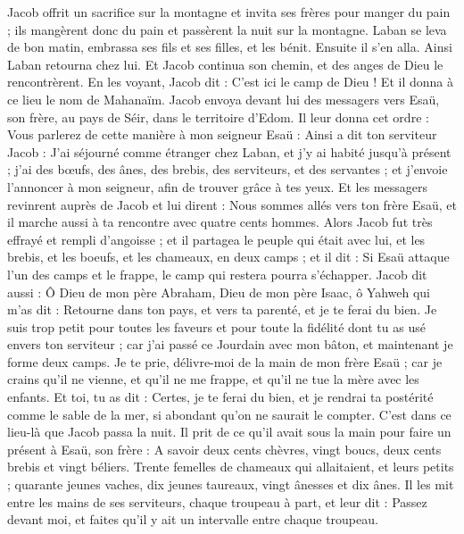 \begin{multicols}{2}
Jacob offrit un sacrifice sur la montagne et invita ses frères pour manger du pain ; ils mangèrent donc du pain et passèrent la nuit sur la montagne.
Laban se leva de bon matin, embrassa ses fils et ses filles, et les bénit. Ensuite il s'en alla. Ainsi Laban retourna chez lui.
\VerseOne{}Et Jacob continua son chemin, et des anges de Dieu le rencontrèrent.
En les voyant, Jacob dit : C'est ici le camp de Dieu ! Et il donna à ce lieu le nom de Mahanaïm.
Jacob envoya devant lui des messagers vers Esaü, son frère, au pays de Séir, dans le territoire d'Edom.
Il leur donna cet ordre : Vous parlerez de cette manière à mon seigneur Esaü : Ainsi a dit ton serviteur Jacob : J'ai séjourné comme étranger chez Laban, et j'y ai habité jusqu'à présent ;
j'ai des bœufs, des ânes, des brebis, des serviteurs, et des servantes ; et j'envoie l'annoncer à mon seigneur, afin de trouver grâce à tes yeux.
Et les messagers revinrent auprès de Jacob et lui dirent : Nous sommes allés vers ton frère Esaü, et il marche aussi à ta rencontre avec quatre cents hommes.
Alors Jacob fut très effrayé et rempli d'angoisse ; et il partagea le peuple qui était avec lui, et les brebis, et les boeufs, et les chameaux, en deux camps ; et il dit :
Si Esaü attaque l'un des camps et le frappe, le camp qui restera pourra s'échapper.
Jacob dit aussi : Ô Dieu de mon père Abraham, Dieu de mon père Isaac, ô Yahweh qui m'as dit : Retourne dans ton pays, et vers ta parenté, et je te ferai du bien.
Je suis trop petit pour toutes les faveurs et pour toute la fidélité dont tu as usé envers ton serviteur ; car j'ai passé ce Jourdain avec mon bâton, et maintenant je forme deux camps.
Je te prie, délivre-moi de la main de mon frère Esaü ; car je crains qu'il ne vienne, et qu'il ne me frappe, et qu'il ne tue la mère avec les enfants.
Et toi, tu as dit : Certes, je te ferai du bien, et je rendrai ta postérité comme le sable de la mer, si abondant qu'on ne saurait le compter.
C'est dans ce lieu-là que Jacob passa la nuit. Il prit de ce qu'il avait sous la main pour faire un présent à Esaü, son frère :
A savoir deux cents chèvres, vingt boucs, deux cents brebis et vingt béliers.
Trente femelles de chameaux qui allaitaient, et leurs petits ; quarante jeunes vaches, dix jeunes taureaux, vingt ânesses et dix ânes.
Il les mit entre les mains de ses serviteurs, chaque troupeau à part, et leur dit : Passez devant moi, et faites qu'il y ait un intervalle entre chaque troupeau.

\end{multicols}
